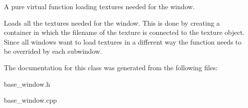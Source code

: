 A pure virtual function loading textures needed for the window. 

Loads all the textures needed for the window. This is done by creating a container in which the filename of the texture is connected to the texture object. Since all windows want to load textures in a different way the function needs to be overrided by each subwindow. 

The documentation for this class was generated from the following files\+:\begin{DoxyCompactItemize}
\item 
base\+\_\+window.\+h\item 
base\+\_\+window.\+cpp\end{DoxyCompactItemize}
